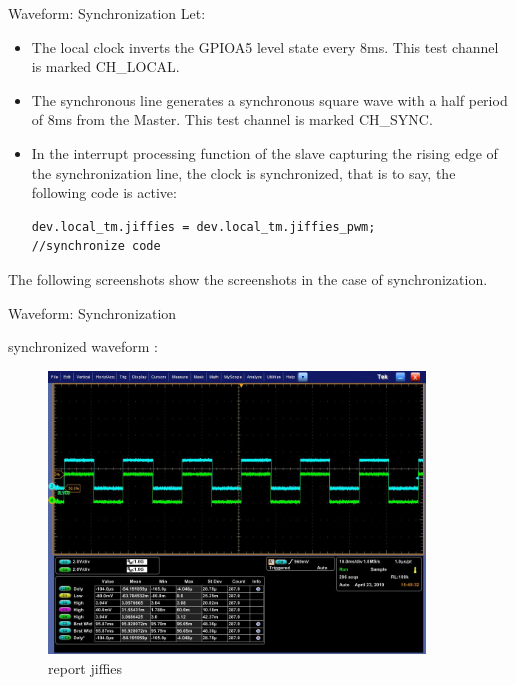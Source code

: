 \begin{frame}[fragile]{Waveform: Synchronization }
Let:
\begin{itemize}
  \item The local clock inverts the GPIOA5 level state every 8ms. This test channel is marked CH\_LOCAL.

  \item The synchronous line generates a synchronous square wave with a half period of 8ms from the Master. This test channel is marked CH\_SYNC.
  \item In the interrupt processing function of the slave capturing the rising edge of the synchronization line, the clock is synchronized, that is to say, the following code is active:

  \begin{lstlisting}
dev.local_tm.jiffies = dev.local_tm.jiffies_pwm;		//synchronize code
  \end{lstlisting}

\end{itemize}

The following screenshots show the screenshots in the case of synchronization.

\end{frame}


\begin{frame}[fragile]{Waveform: Synchronization}

synchronized waveform :

  \begin{figure}[htbp]
  \begin{center}
  \includegraphics[width=10cm]{img/sync}
  \caption{report jiffies}
  \label{report}
  \end{center}
  \vspace{-0.5em}
  \end{figure}


\end{frame}

